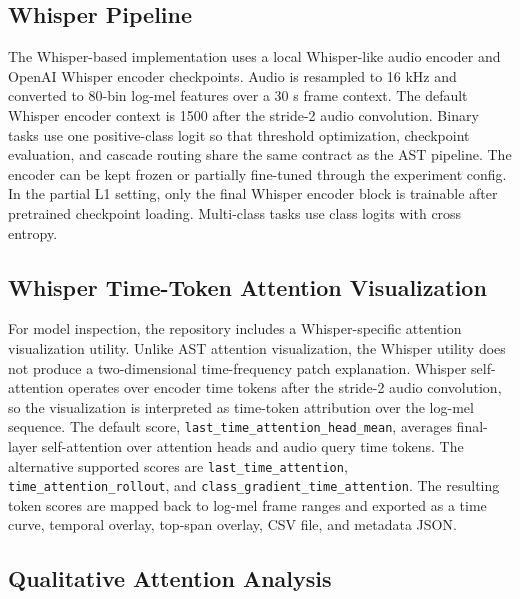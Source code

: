 \documentclass[11pt]{article}
\begin{document}
\subsection{Whisper Pipeline}

The Whisper-based implementation uses a local Whisper-like audio encoder and
OpenAI Whisper encoder checkpoints. Audio is resampled to 16 kHz and converted
to 80-bin log-mel features over a 30 s frame context. The default Whisper
encoder context is 1500 after the stride-2 audio convolution. Binary tasks use
one positive-class logit so that threshold optimization, checkpoint evaluation,
and cascade routing share the same contract as the AST pipeline. The encoder
can be kept frozen or partially fine-tuned through the experiment config. In
the partial L1 setting, only the final Whisper encoder block is trainable after
pretrained checkpoint loading. Multi-class tasks use class logits with cross
entropy.

\subsection{Whisper Time-Token Attention Visualization}

For model inspection, the repository includes a Whisper-specific attention
visualization utility. Unlike AST attention visualization, the Whisper utility
does not produce a two-dimensional time-frequency patch explanation. Whisper
self-attention operates over encoder time tokens after the stride-2 audio
convolution, so the visualization is interpreted as time-token attribution over
the log-mel sequence. The default score,
\texttt{last\_time\_attention\_head\_mean}, averages final-layer self-attention
over attention heads and audio query time tokens. The alternative supported
scores are \texttt{last\_time\_attention}, \texttt{time\_attention\_rollout},
and \texttt{class\_gradient\_time\_attention}. The resulting token scores are
mapped back to log-mel frame ranges and exported as a time curve, temporal
overlay, top-span overlay, CSV file, and metadata JSON.

\subsection{Qualitative Attention Analysis}
\end{document}
